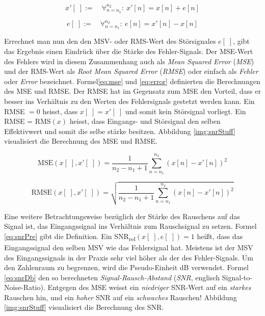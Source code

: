 \begin{equation}
x'[\;] := \quad \mathop{\forall}_{n = n_1}^{n_2} :\ x'[n] = x[n] + e[n]
\label{eq:sigErrorAddition}
\end{equation}

\begin{equation}
e[\;] := \quad \mathop{\forall}_{n = n_1}^{n_2} :\ e[n] = x'[n] -x[n]
\label{eq:calErrorSig}
\end{equation}

 Errechnet man nun den den MSV- oder RMS-Wert des Störsignales $e[\;]$, gibt das Ergebnis einen Eindrück über die \glqq Stärke \grqq{} des Fehler-Signals. Der MSE-Wert des Fehlers wird in diesem Zusammenhang auch als \emph{Mean Squared Error} (\emph{MSE}) und der RMS-Wert als \emph{Root Mean Squared Error} (\emph{RMSE}) oder einfach als \emph{Fehler} oder \emph{Error} bezeichnet. Formel\ref{eq:mse} und \ref{eq:error} definierten die Berechnungen des MSE und RMSE. Der RMSE hat im Gegensatz zum MSE den Vorteil, dass er besser ins Verhältnis zu den Werten des Fehlersignals gestetzt werden kann. Ein RMSE $= 0$ heisst, dass $x[\;] = x'[\;]$ und somit kein Störsignal vorliegt. Ein RMSE = RMS$(x)$ heisst, dass Eingangs- und Störsignal den selben Effektivwert und somit die selbe \glqq stärke\grqq{} besitzen. Abbildung \ref{img:snrStuff} visualisiert die Berechnung des MSE und RMSE. \cite[S: 28 - 29]{dspMichigan}

\begin{equation}
\text{MSE}(x[\;],x'[\;]) = \frac{1}{n_2 - n_1 + 1} \sum_{n = n_1}^{n_2} (x[n]-x'[n])^2
\label{eq:mse}
\end{equation}

\begin{equation}
\text{RMSE}(x[\;],x'[\;]) = \sqrt{\frac{1}{n_2 - n_1 + 1} \sum_{n = n_1}^{n_2} (x[n]-x'[n])^2}
\label{eq:error}
\end{equation}

Eine weitere Betrachtungsweise bezüglich der Stärke des Rauschens auf das Signal ist, das Eingangssignal ins Verhältnis zum Rauschsignal zu setzen. Formel \ref{eq:snrPre} gibt die Definition. Ein SNR\textsubscript{rel}$(x[\;],e[\;]) = 1$ heißt, dass das Eingangssignal den selben MSV wie das Fehlersignal hat. Meistens ist der MSV des Eingangssignals in der Praxis sehr viel höher als der des Fehler-Signals. Um den Zahlenraum zu begrenzen, wird die Pseudo-Einheit dB verwendet. Formel \ref{eq:snrDb} den so berechneten \emph{Signal-Rausch-Abstand} (\emph{SNR}, englisch Signal-to-Noise-Ratio). Entgegen des MSE weisst ein \emph{niedriger} SNR-Wert auf ein \emph{starkes} Rauschen hin, und ein \emph{hoher} SNR auf ein \emph{schwaches} Rauschen! Abbildung \ref{img:snrStuff} visualisiert die Berechnung des SNR.

